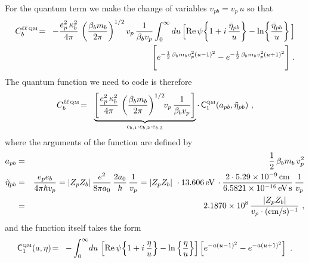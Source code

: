 \documentclass[preprint,12pt,eqsecnum,nofootinbib,amsmath,amssymb]{revtex4}
\newcommand{\smQM}{{\rm\scriptscriptstyle QM}}
\begin{document}
{{For the quantum term we make the change of variables
$v_{pb}= v_p\,u$ so that
\begin{eqnarray}
  C^{\ell\ell \, \smQM}_b
  &\!=\!&  
  -\frac{e_p^2\, \kappa_b^2}{4\pi}\,
  \left( \frac{\beta_b m_b}{2\pi} \right)^{1/2} v_p \, 
  \frac{1}{\beta_b v_p}
  \int_0^\infty du\, 
  \Big[{\rm Re}\,\psi\!\left\{ 1 + i\, \frac{\bar\eta_{pb}}{u}
  \right\}
  - \ln\!\left\{\frac{\bar\eta_{pb}}{u} \right\} \Big] 
\nonumber
\\ && \hskip2.5cm
  \Bigg[ e^{-\frac{1}{2}\,\beta_b m_b v_p^2 (u-1)^2} 
  -
  e^{-\frac{1}{2}\,\beta_b m_b v_p^2 (u+1)^2}  
  \Bigg] \ .
\end{eqnarray}
The quantum function we need to code is therefore
\begin{eqnarray}
  C^{\ell \ell \, \smQM}_b
  &\!=\!&  
  \underbrace{
  \left[\frac{e_p^2\, \kappa_b^2}{4\pi}\,
  \left( \frac{\beta_b m_b}{2\pi} \right)^{1/2} \!\! v_p\,
  \frac{1}{\beta_b v_p}
  \right] 
  }_{c_{b, 1} \cdot c_{b, 2} \cdot c_{b, 3}}
  \cdot \,
  {\sf C}_1^\smQM(a_{pb}, \tilde\eta_{pb}) \ ,
\label{qmA}
\end{eqnarray}
where the arguments of the function are defined by 
\begin{eqnarray}
  a_{pb} 
  &=& 
  \frac{1}{2}\,\beta_b m_b\, v_p^2
\\
  \tilde\eta_{pb}
  &=& 
  \frac{e_p e_b}{4 \pi \hbar v_p}
  =
  \vert Z_p Z_b\vert\,\frac{e^2}{8 \pi a_0}\,\frac{2 a_0}{\hbar}\,
  \frac{1}{v_p}
  =
  \vert Z_p Z_b\vert\ \cdot 13.606\,{\rm eV}\,\cdot
  \frac{2 \cdot 5.29 \times 10^{-9}\,{\rm cm}}{6.5821 \times
  10^{-16}\,{\rm eV\,s}}\,
  \frac{1}{v_p}
\nonumber
\\
  &=&
  2.1870 \times 10^8 \, \frac{\vert Z_p Z_b\vert}{v_p
  \cdot ({\rm cm/s})^{-1}} \ ,
\end{eqnarray}
and the function itself takes the form
\begin{eqnarray}
  {\sf C}_1^\smQM(a,\eta)
  &\!=\!&  
  -\int_0^\infty \! du\, 
  \left[{\rm Re}\,\psi\! \left\{1 + i\, \frac{\eta}{u} \right\} - 
  \ln\left\{ \frac{\eta}{u}  \right\} \right]
  \left[e^{-a(u-1)^2} - e^{-a(u+1)^2} 
  \right] \ .
\label{qmAB}
\end{eqnarray}


}}
\end{document}
